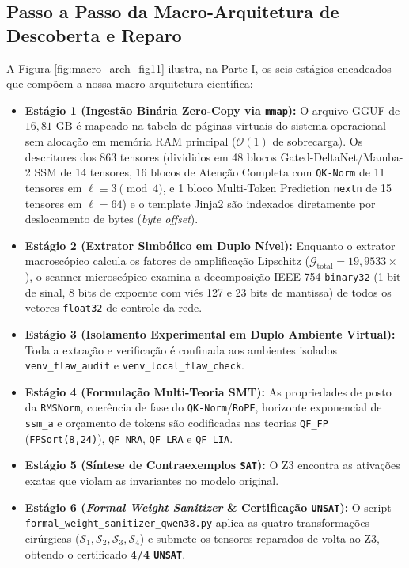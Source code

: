 \documentclass[11pt,a4paper]{article}
\theoremstyle{definition}
\begin{document}
\subsection{Passo a Passo da Macro-Arquitetura de Descoberta e Reparo}

A Figura \ref{fig:macro_arch_fig11} ilustra, na Parte I, os seis estágios encadeados que compõem a nossa macro-arquitetura científica:
\begin{itemize}
    \item \textbf{Estágio 1 (Ingestão Binária Zero-Copy via \texttt{mmap}):} O arquivo GGUF de $16{,}81\text{ GB}$ é mapeado na tabela de páginas virtuais do sistema operacional sem alocação em memória RAM principal ($\mathcal{O}(1)$ de sobrecarga). Os descritores dos 863 tensores (divididos em 48 blocos Gated-DeltaNet/Mamba-2 SSM de 14 tensores, 16 blocos de Atenção Completa com \texttt{QK-Norm} de 11 tensores em $\ell \equiv 3 \pmod 4$, e 1 bloco Multi-Token Prediction \texttt{nextn} de 15 tensores em $\ell = 64$) e o template Jinja2 são indexados diretamente por deslocamento de bytes (\textit{byte offset}).
    \item \textbf{Estágio 2 (Extrator Simbólico em Duplo Nível):} Enquanto o extrator macroscópico calcula os fatores de amplificação Lipschitz ($\mathcal{G}_{\text{total}} = 19{,}9533\times$), o scanner microscópico examina a decomposição IEEE-754 \texttt{binary32} (1 bit de sinal, 8 bits de expoente com viés 127 e 23 bits de mantissa) de todos os vetores \texttt{float32} de controle da rede.
    \item \textbf{Estágio 3 (Isolamento Experimental em Duplo Ambiente Virtual):} Toda a extração e verificação é confinada aos ambientes isolados \texttt{venv\_flaw\_audit} e \texttt{venv\_local\_flaw\_check}.
    \item \textbf{Estágio 4 (Formulação Multi-Teoria SMT):} As propriedades de posto da \texttt{RMSNorm}, coerência de fase do \texttt{QK-Norm}/\texttt{RoPE}, horizonte exponencial de \texttt{ssm\_a} e orçamento de tokens são codificadas nas teorias \texttt{QF\_FP} (\texttt{FPSort(8,24)}), \texttt{QF\_NRA}, \texttt{QF\_LRA} e \texttt{QF\_LIA}.
    \item \textbf{Estágio 5 (Síntese de Contraexemplos \texttt{SAT}):} O Z3 encontra as ativações exatas que violam as invariantes no modelo original.
    \item \textbf{Estágio 6 (\textit{Formal Weight Sanitizer} \& Certificação \texttt{UNSAT}):} O script \texttt{formal\_weight\_sanitizer\_qwen38.py} aplica as quatro transformações cirúrgicas ($\mathcal{S}_1, \mathcal{S}_2, \mathcal{S}_3, \mathcal{S}_4$) e submete os tensores reparados de volta ao Z3, obtendo o certificado \textbf{4/4 \texttt{UNSAT}}.
\end{itemize}
\end{document}
